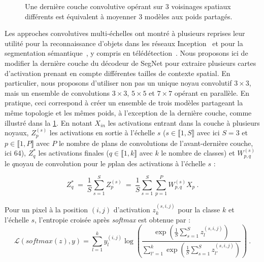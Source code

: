 \begin{figure}[t]
  \resizebox{\textwidth}{!}{}
  \caption{Une dernière couche convolutive opérant sur 3 voisinages spatiaux différents est équivalent à moyenner 3 modèles aux poids partagés.}
  \label{fig:contextual_module}
\end{figure}

Les approches convolutives multi-échelles ont montré à plusieurs reprises leur utilité pour la reconnaissance d'objets dans les réseaux Inception~\cite{szegedy_going_2015} et pour la segmentation sémantique~\cite{yu_multi-scale_2015}, y compris en télédétection~\cite{zhao_learning_2016}. Nous proposons ici de modifier la dernière couche du décodeur de SegNet pour extraire plusieurs cartes d'activation prenant en compte différentes tailles de contexte spatial. En particulier, nous proposons d'utiliser non pas un unique noyau convolutif $3\times3$, mais un ensemble de convolutions $3\times3$, $5\times5$ et $7\times7$ opérant en parallèle. En pratique, ceci correspond à créer un ensemble de trois modèles partageant la même topologie et les mêmes poids, à l'exception de la dernière couche, comme illustré dans la \cref{fig:contextual_module}. En notant $X_\mathit{in}$ les activations entrant dans la couche à plusieurs noyaux, $Z_p^{(s)}$ les activations en sortie à l'échelle $s$ ($s \in \llbracket 1, S\rrbracket$ avec ici $S = 3$ et $p \in \llbracket 1, P \rrbracket$ avec $P$ le nombre de plans de convolutions de l'avant-dernière couche, ici 64), $Z^*_q$ les activations finales ($q \in \llbracket 1, k \rrbracket$ avec $k$ le nombre de classes) et $W_{p,q}^{(s)}$ le $q$\ieme noyau de convolution pour le $p$\ieme plan des activations à l'échelle $s$ :

\begin{equation}
Z^*_q \  = \  \frac{1}{S} \sum_{s=1}^S Z_p^{(s)} \  = \  \frac{1}{S} \sum_{s=1}^S \sum_{p=1}^P W_{p,q}^{(s)} X_p~.
\end{equation}

Pour un pixel à la position $(i,j)$ d'activation $z_{k}^{(s,i,j)}$ pour la classe $k$ et l'échelle $s$, l'entropie croisée après \emph{softmax} est obtenue par :
\begin{equation}
\mathcal{L}(\mathit{softmax}(z),y) = \sum_{l=1}^{k} y_l^{(i,j)} \log\left(\frac{\exp\left(\frac{1}{S} \sum\limits_{s=1}^S {z_{l}^{(s,i,j)}}\right)}{\sum\limits_{l'=1}^k \exp\left(\frac{1}{S} \sum\limits_{s=1}^S{z_{l'}^{(s,i,j)}}\right)}\right)~.
\end{equation}

